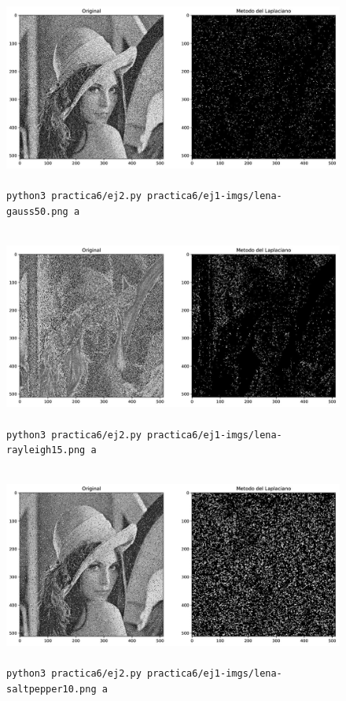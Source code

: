\documentclass[11pt, spanish]{article}
\begin{document}
\begin{figure}[H]
\centering
    \includegraphics[height=6.5cm]{informe-imgs/ej2-a-lena-gauss50.jpg}
    \caption{\texttt{python3 practica6/ej2.py practica6/ej1-imgs/lena-gauss50.png a}}
\end{figure}

\begin{figure}[H]
\centering
    \includegraphics[height=6.5cm]{informe-imgs/ej2-a-lena-rayleigh15.jpg}
    \caption{\texttt{python3 practica6/ej2.py practica6/ej1-imgs/lena-rayleigh15.png a}}
\end{figure}

\begin{figure}[H]
\centering
    \includegraphics[height=6.5cm]{informe-imgs/ej2-a-lena-saltpepper10.jpg}
    \caption{\texttt{python3 practica6/ej2.py practica6/ej1-imgs/lena-saltpepper10.png a}}
\end{figure}
\end{document}
